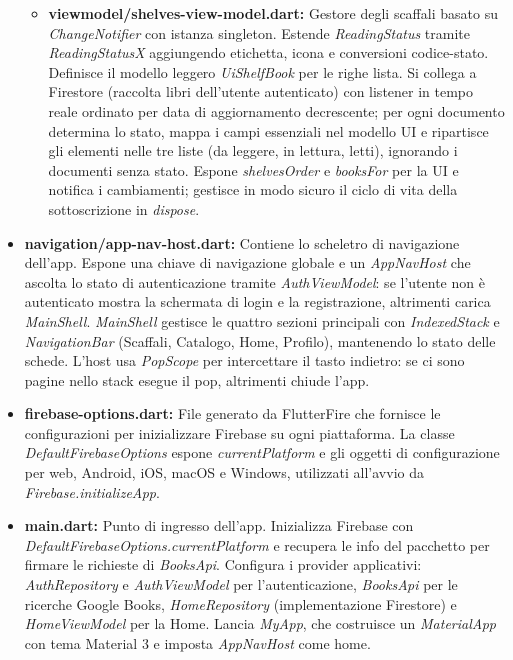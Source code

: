 \documentclass{article}
\begin{document}
\begin{itemize}
\begin{itemize}
    \item \textbf{viewmodel/shelves-view-model.dart:}
    Gestore degli scaffali basato su \textit{ChangeNotifier} con istanza singleton. Estende \textit{ReadingStatus} tramite \textit{ReadingStatusX} aggiungendo etichetta, icona e conversioni codice-stato. Definisce il modello leggero \textit{UiShelfBook} per le righe lista. Si collega a Firestore (raccolta libri dell’utente autenticato) con listener in tempo reale ordinato per data di aggiornamento decrescente; per ogni documento determina lo stato, mappa i campi essenziali nel modello UI e ripartisce gli elementi nelle tre liste (da leggere, in lettura, letti), ignorando i documenti senza stato. Espone \textit{shelvesOrder} e \textit{booksFor} per la UI e notifica i cambiamenti; gestisce in modo sicuro il ciclo di vita della sottoscrizione in \textit{dispose}.
  \end{itemize}
  \item \textbf{navigation/app-nav-host.dart:}
  Contiene lo scheletro di navigazione dell’app. Espone una chiave di navigazione globale e un \textit{AppNavHost} che ascolta lo stato di autenticazione tramite \textit{AuthViewModel}: se l’utente non è autenticato mostra la schermata di login e la registrazione, altrimenti carica \textit{MainShell}. \textit{MainShell} gestisce le quattro sezioni principali con \textit{IndexedStack} e \textit{NavigationBar} (Scaffali, Catalogo, Home, Profilo), mantenendo lo stato delle schede. L’host usa \textit{PopScope} per intercettare il tasto indietro: se ci sono pagine nello stack esegue il pop, altrimenti chiude l’app.
  \item \textbf{firebase-options.dart:}
  File generato da FlutterFire che fornisce le configurazioni per inizializzare Firebase su ogni piattaforma. La classe \textit{DefaultFirebaseOptions} espone \textit{currentPlatform} e gli oggetti di configurazione per web, Android, iOS, macOS e Windows, utilizzati all’avvio da \textit{Firebase.initializeApp}.
  \item \textbf{main.dart:}
  Punto di ingresso dell’app. Inizializza Firebase con \textit{DefaultFirebaseOptions.currentPlatform} e recupera le info del pacchetto per firmare le richieste di \textit{BooksApi}. Configura i provider applicativi: \textit{AuthRepository} e \textit{AuthViewModel} per l’autenticazione, \textit{BooksApi} per le ricerche Google Books, \textit{HomeRepository} (implementazione Firestore) e \textit{HomeViewModel} per la Home. Lancia \textit{MyApp}, che costruisce un \textit{MaterialApp} con tema Material 3 e imposta \textit{AppNavHost} come home.
\end{itemize}
\end{document}
